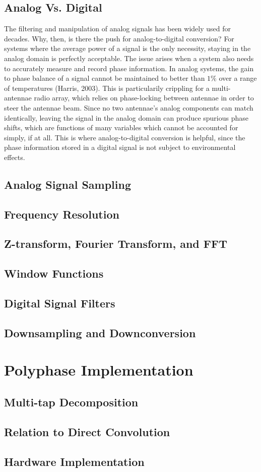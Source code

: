 \documentclass{report}
\begin{document}
\section{Analog Vs. Digital}

The filtering and manipulation of analog signals has been widely used for decades.  Why, then, is there the push for analog-to-digital conversion?  For systems where the average power of a signal is the only necessity, staying in the analog domain is perfectly acceptable.  The issue arises when a system also needs to accurately measure and record phase information.  In analog systems, the gain to phase balance of a signal cannot be maintained to better than $1\%$ over a range of temperatures (Harris, 2003).  This is particularily crippling for a multi-antennae radio array, which relies on phase-locking between antennae in order to steer the antennae beam.  Since no two antennae's analog components can match identically, leaving the signal in the analog domain can produce spurious phase shifts, which are functions of many variables which cannot be accounted for simply, if at all.  This is where analog-to-digital conversion is helpful, since the phase information stored in a digital signal is not subject to environmental effects.  

\section{Analog Signal Sampling}
\section{Frequency Resolution}
\section{Z-transform, Fourier Transform, and FFT}
\section{Window Functions}
\section{Digital Signal Filters}
\section{Downsampling and Downconversion}

\chapter{Polyphase Implementation}
\section{Multi-tap Decomposition}
\section{Relation to Direct Convolution}
\section{Hardware Implementation}
 
\end{document}
